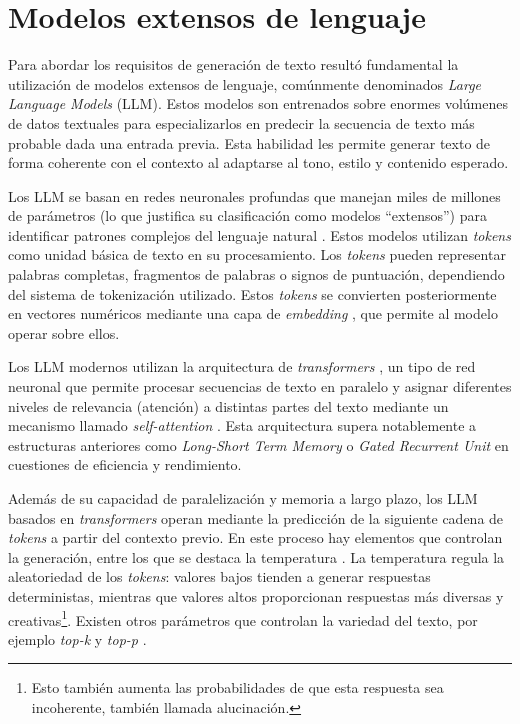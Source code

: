 \section{Modelos extensos de lenguaje}
Para abordar los requisitos de generación de texto resultó fundamental la utilización 
de modelos extensos de lenguaje, comúnmente denominados \textit{Large Language Models} (LLM).
Estos modelos son entrenados sobre enormes volúmenes de datos textuales para especializarlos
en predecir la secuencia de texto más probable dada una entrada previa.
Esta habilidad les permite generar texto de forma coherente con el contexto
al adaptarse al tono, estilo y contenido esperado.

Los LLM se basan en redes neuronales profundas que manejan miles de millones de parámetros
(lo que justifica su clasificación como modelos ``extensos'') para identificar patrones complejos del lenguaje natural \cite{att_is_all_you_need}. 
Estos modelos utilizan \textit{tokens} como unidad básica de texto en su procesamiento.
Los \textit{tokens} pueden representar palabras completas, fragmentos de palabras o signos de puntuación,
dependiendo del sistema de tokenización utilizado.
Estos \textit{tokens} se convierten posteriormente en vectores numéricos
mediante una capa de \textit{embedding} \cite{mikolov2013efficient}, que permite al modelo operar sobre ellos.

Los LLM modernos utilizan la arquitectura de \textit{transformers} \cite{att_is_all_you_need},
un tipo de red neuronal que permite procesar secuencias de texto en paralelo y asignar diferentes niveles de relevancia
(atención) a distintas partes del texto mediante un mecanismo llamado \textit{self-attention} \cite{att_is_all_you_need}.
Esta arquitectura supera notablemente a estructuras anteriores como \textit{Long-Short Term Memory} \cite{hochreiter1997long}
o \textit{Gated Recurrent Unit} \cite{cho2014learning} en cuestiones de eficiencia y rendimiento.

Además de su capacidad de paralelización y memoria a largo plazo, los LLM basados en \textit{transformers} operan 
mediante la predicción de la siguiente cadena de \textit{tokens} a partir del contexto previo.
En este proceso hay elementos que controlan la generación, entre los que se destaca la temperatura \cite{radford2019language}.
La temperatura regula la aleatoriedad de los \textit{tokens}: valores bajos tienden a generar respuestas deterministas,
mientras que valores altos proporcionan respuestas más diversas y creativas\footnote{
	Esto también aumenta las probabilidades de que esta respuesta sea incoherente, también llamada alucinación.
}. Existen otros parámetros que controlan la variedad del texto, por ejemplo \textit{top-k} y \textit{top-p} \cite{holtzman2019curious}.

